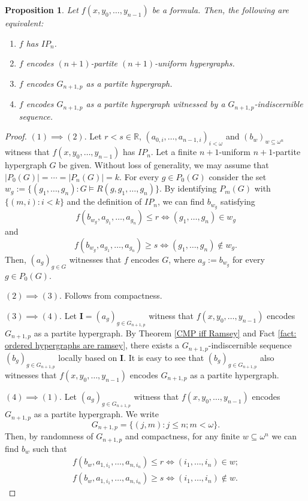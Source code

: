 \documentclass{amsart}
\newtheorem{prop}[teor]{Proposition}
\newtheorem{external claim}[teor]{Claim}
\newcommand{\II}{\mathbf{I}}
\begin{document}
\begin{prop} \label{IP_n iff encoding partite} Let $f(x,y_0,\dots,y_{n-1})$ be a formula. Then, the following are equivalent:
\begin{enumerate}
    \item $f$ has $IP_n$.
    \item $f$ encodes $(n+1)$-partite $(n+1)$-uniform hypergraphs.
    \item $f$ encodes $G_{n+1,p}$ as a partite hypergraph.
    \item $f$ encodes $G_{n+1,p}$ as a partite hypergraph witnessed by a $G_{n+1,p}$-indiscernible sequence.
\end{enumerate}
\end{prop}
\begin{proof}
    $(1)\implies(2)$. Let $r<s\in \mathbb{R}$, $( a_{0,i},\dots, a_{n-1,i} )_{i<\omega}$ and $(b_w)_{w\subseteq\omega^n}$ witness that $f(x,y_0,\dots,y_{n-1})$ has $IP_n$. Let a finite $n+1$-uniform $n+1$-partite hypergraph $G$ be given. Without loss of generality, we may assume that $\lvert P_0(G)\rvert=\cdots=\lvert P_n(G)\rvert=k$. For every $g\in P_0(G)$ consider the set $w_g:=\{(g_1,\dots,g_n): G\models R(g,g_1,\dots,g_n)\}$. By identifying $P_m(G)$ with $\{ (m,i): i<k\}$ and the definition of $IP_n$, we can find $b_{w_g}$ satisfying $$ f(b_{w_g}, a_{g_1},\dots, a_{g_n}  )\leq r \iff (g_1,\dots, g_{n})\in w_g$$ and $$f(b_{w_g}, a_{g_1},\dots, a_{g_n}  )\geq s \iff (g_1,\dots, g_{n})\notin w_g.$$ Then, $(a_g)_{g\in G}$ witnesses that $f$ encodes $G$, where $a_g:=b_{w_g}$ for every $g\in P_0(G)$.
    
    $(2)\implies(3)$. Follows from compactness.
    
    $(3)\implies(4)$. Let $\II=(a_g)_{g\in G_{n+1,p}}$ witness that $f(x,y_0,\dots,y_{n-1})$ encodes $G_{n+1,p}$ as a partite hypergraph. By Theorem \ref{CMP iff Ramsey} and Fact \ref{fact: ordered hypergraphs are ramsey}, there exists a $G_{n+1,p}$-indiscernible sequence $(b_g)_{g\in G_{n+1,p}}$ locally based on $\II$. It is easy to see that $(b_g)_{g\in G_{n+1,p}}$ also witnesses that $f(x,y_0,\dots,y_{n-1})$ encodes $G_{n+1,p}$ as a partite hypergraph.
    
    $(4)\implies(1)$. Let $(a_g)_{g\in G_{n+1,p}}$ witness that $f(x,y_0,\dots,y_{n-1})$ encodes $G_{n+1,p}$ as a partite hypergraph. We write $$G_{n+1,p}=\{ (j,m): j\leq n; m<\omega \}.$$ Then, by randomness of $G_{n+1,p}$ and compactness, for any  finite $w\subseteq \omega^n$ we can find $b_{w}$ such that
    \begin{align*}
        f(b_{w}, a_{1,i_1},\dots, a_{n,i_{n}}  )\leq r \iff (i_1,\dots, i_{n})\in w; \\
        f(b_{w}, a_{1,i_1},\dots, a_{n,i_{n}}  )\geq s \iff (i_1,\dots, i_{n})\notin w.
    \end{align*}
\end{proof}
\end{document}
